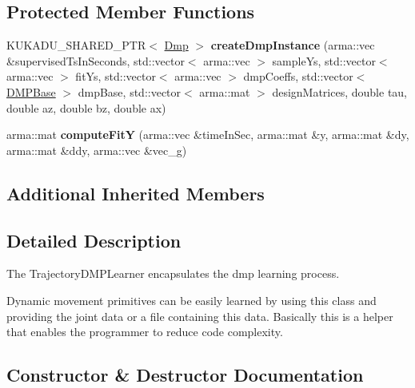 \subsection*{Protected Member Functions}
\begin{DoxyCompactItemize}
\item 
K\+U\+K\+A\+D\+U\+\_\+\+S\+H\+A\+R\+E\+D\+\_\+\+P\+TR$<$ \hyperlink{classkukadu_1_1Dmp}{Dmp} $>$ {\bfseries create\+Dmp\+Instance} (arma\+::vec \&supervised\+Ts\+In\+Seconds, std\+::vector$<$ arma\+::vec $>$ sample\+Ys, std\+::vector$<$ arma\+::vec $>$ fit\+Ys, std\+::vector$<$ arma\+::vec $>$ dmp\+Coeffs, std\+::vector$<$ \hyperlink{classkukadu_1_1DMPBase}{D\+M\+P\+Base} $>$ dmp\+Base, std\+::vector$<$ arma\+::mat $>$ design\+Matrices, double tau, double az, double bz, double ax)\hypertarget{classkukadu_1_1JointDMPLearner_a1e1bf80ba81e702fb0bc60f8ac2f899b}{}\label{classkukadu_1_1JointDMPLearner_a1e1bf80ba81e702fb0bc60f8ac2f899b}

\item 
arma\+::mat {\bfseries compute\+FitY} (arma\+::vec \&time\+In\+Sec, arma\+::mat \&y, arma\+::mat \&dy, arma\+::mat \&ddy, arma\+::vec \&vec\+\_\+g)\hypertarget{classkukadu_1_1JointDMPLearner_a36b5758b427bcc8047899cebc4a2a693}{}\label{classkukadu_1_1JointDMPLearner_a36b5758b427bcc8047899cebc4a2a693}

\end{DoxyCompactItemize}
\subsection*{Additional Inherited Members}


\subsection{Detailed Description}
The Trajectory\+D\+M\+P\+Learner encapsulates the dmp learning process. 

Dynamic movement primitives can be easily learned by using this class and providing the joint data or a file containing this data. Basically this is a helper that enables the programmer to reduce code complexity. 

\subsection{Constructor \& Destructor Documentation}
